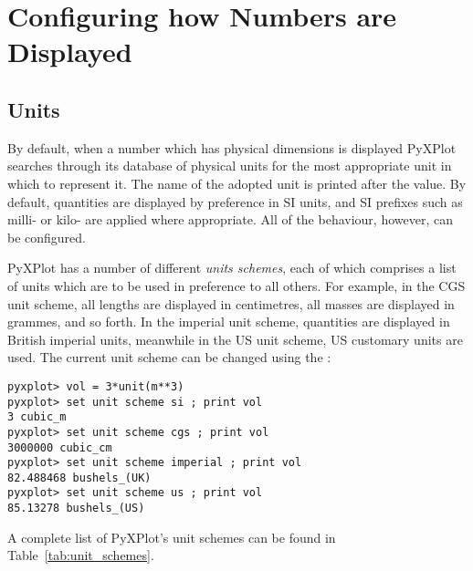\section{Configuring how Numbers are Displayed}
\label{sec:unitdisp}

\subsection{Units}

By default, when a number which has physical dimensions is displayed PyXPlot
searches through its database of physical units for the most appropriate unit
in which to represent it. The name of the adopted unit is printed after the
value. By default, quantities are displayed by preference in SI units, and SI
prefixes such as milli- or kilo- are applied where appropriate. All of the
behaviour, however, can be configured.

PyXPlot has a number of different {\it units schemes}, each of which comprises a list of units which are to be used in
preference to all others. For example, in the CGS unit scheme, all lengths are displayed in centimetres, all masses
are displayed in grammes, and so forth. In the imperial unit
scheme, quantities are displayed in
British imperial units, meanwhile in the US unit scheme, US customary units are
used. The current unit scheme can be changed using the :

\begin{verbatim}
pyxplot> vol = 3*unit(m**3)
pyxplot> set unit scheme si ; print vol
3 cubic_m
pyxplot> set unit scheme cgs ; print vol
3000000 cubic_cm
pyxplot> set unit scheme imperial ; print vol
82.488468 bushels_(UK)
pyxplot> set unit scheme us ; print vol
85.13278 bushels_(US)
\end{verbatim}

\noindent A complete list of PyXPlot's unit schemes can be found in
Table~\ref{tab:unit_schemes}.

\begin{table}
\caption{A list of PyXPlot's unit schemes.}
\label{tab:unit_schemes}
\end{table}

